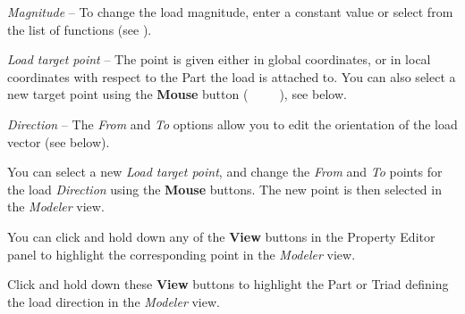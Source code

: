 \begin{bulletlist}
  \setlength\itemsep{1mm}

\item{\sl Magnitude} --
  To change the load magnitude, enter a constant value or select from the
  list of functions (see ).

\item{\sl Load target point} --
  The point is given either in global coordinates, \newline
  or in local coordinates with respect to the Part the load is attached to.
  You can also select a new target point using the \textbf{Mouse} button
  (~~~~~), see  below.

\item{\sl Direction} --
  The {\sl From} and {\sl To} options allow you to edit the orientation of the
  load vector (see  below).

\item
  You can select a new {\sl Load target point}, and change the {\sl From} and
  {\sl To} points for the load {\sl Direction} using the \textbf{Mouse} buttons.
  The new point is then selected in the {\sl Modeler} view.

\item
  You can click and hold down any of the \textbf{View} buttons in the Property
  Editor panel to highlight the corresponding point in the {\sl Modeler} view.

\item
  Click and hold down these \textbf{View} buttons to highlight the Part or
  Triad defining the load direction in the {\sl Modeler} view.
\end{bulletlist}







